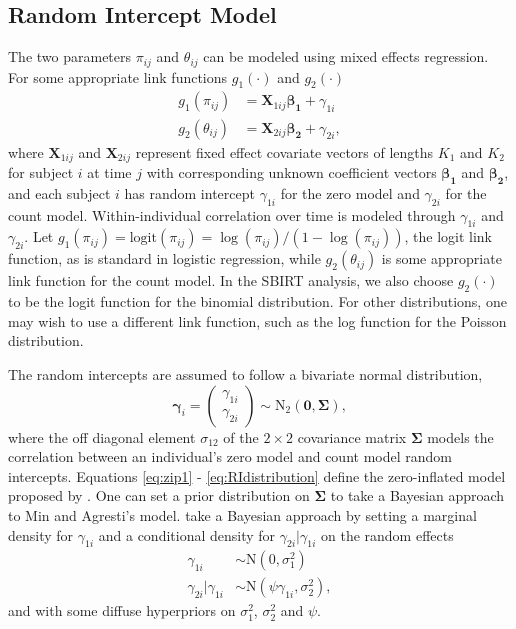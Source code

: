 \documentclass[12pt]{article}
\begin{document}
\subsection{Random Intercept Model} \label{sec: rimodel}
The two parameters $\pi_{ij}$ and $\theta_{ij}$ can be modeled using mixed effects regression. For some appropriate link functions $g_{1}(\cdot)$ and $g_{2}(\cdot)$
\begin{align}
	g_{1}(\pi_{ij}) &= \bm{X}_{1ij} \bm{\beta_{1}} + \gamma_{1i} \label{eq:linearzerori}\\ 
	g_{2}( \theta_{ij}) &= \bm{X}_{2ij} \bm{\beta_{2}} + \gamma_{2i}, \label{eq:linearcountri}
\end{align}
where $\bm{X}_{1ij}$ and $\bm{X}_{2ij}$ represent fixed effect covariate vectors of lengths $K_{1}$ and $K_{2}$ for subject $i$ at time $j$ with corresponding unknown coefficient vectors $\bm{\beta_{1}}$ and $\bm{\beta_{2}}$, and each subject $i$ has random intercept $\gamma_{1i}$ for the zero model and $\gamma_{2i}$ for the count model. Within-individual correlation over time is modeled through $\gamma_{1i}$ and $\gamma_{2i}$. Let $g_{1}(\pi_{ij}) = \text{logit}(\pi_{ij}) = \log(\pi_{ij})/(1- \log(\pi_{ij}))$, the logit link function, as is standard in logistic regression, while $g_{2}( \theta_{ij})$ is some appropriate link function for the count model. In the SBIRT analysis, we also choose $g_{2}( \cdot)$ to be the logit function for the binomial distribution. For other distributions, one may wish to use a different link function, such as the log function for the Poisson distribution.

The random intercepts are assumed to follow a bivariate normal distribution,
\begin{equation}
	\mathbf{\gamma}_{i} = 
	\begin{pmatrix}
		\gamma_{1i} \\
		\gamma_{2i}
	\end{pmatrix}
	\sim
	\text{N}_2 \left(
	\mathbf{0}
	, \mathbf{\Sigma}
	\right),
	\label{eq:RIdistribution}
\end{equation}
where the off diagonal element $\sigma_{12}$ of the $2 \times 2$ covariance matrix $\mathbf{\Sigma}$ models the correlation between an individual's zero model and count model random intercepts. Equations \eqref{eq:zip1} - \eqref{eq:RIdistribution} define the zero-inflated model proposed by \cite{min2005random}. One can set a prior distribution on $\mathbf{\Sigma}$ to take a Bayesian approach to Min and Agresti's model. \cite{neelon2010bayesian} take a Bayesian approach by setting a marginal density for $\gamma_{1i}$ and a conditional density for $\gamma_{2i}|\gamma_{1i}$ \citep{spiegelhalter1998bayesian, cooper2007predicting} on the random effects
\begin{align}
	\gamma_{1i} &\sim \text{N}(0, \sigma_{1}^{2}) \label{eq:zero_ri_dist}\\
	 \gamma_{2i}|\gamma_{1i} &\sim \text{N}(\psi \gamma_{1i}, \sigma_{2}^{2}), \label{eq:count_ri_dist}
\end{align}
and with some diffuse hyperpriors on $\sigma_{1}^2$, $\sigma_{2}^{2}$ and $\psi$.
\end{document}
